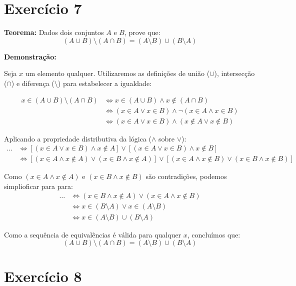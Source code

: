 \documentclass[11pt,reqno,a4paper]{amsart}
\begin{document}
\newpage
\section*{Exercício 7}

\textbf{Teorema:} Dados dois conjuntos $A$ e $B$, prove que:
\[ (A \cup B) \setminus (A \cap B) = (A \setminus B) \cup (B \setminus A) \]

\textbf{Demonstração:}

Seja $x$ um elemento qualquer. Utilizaremos as definições de união ($\cup$), intersecção ($\cap$) e diferença ($\setminus$) para estabelecer a igualdade:

\begin{align*}
x \in (A \cup B) \setminus (A \cap B) &\iff x \in (A \cup B) \land x \notin (A \cap B) \tag{Def. de diferença} \\
&\iff (x \in A \lor x \in B) \land \neg(x \in A \land x \in B) \tag{Def. de $\cup$ e $\cap$} \\
&\iff (x \in A \lor x \in B) \land (x \notin A \lor x \notin B) \tag{Lei de De Morgan}
\end{align*}

Aplicando a propriedade distributiva da lógica ($\land$ sobre $\lor$):
\begin{align*}
\dots &\iff [(x \in A \lor x \in B) \land x \notin A] \lor [(x \in A \lor x \in B) \land x \notin B] \\
&\iff [(x \in A \land x \notin A) \lor (x \in B \land x \notin A)] \lor [(x \in A \land x \notin B) \lor (x \in B \land x \notin B)]
\end{align*}

Como $(x \in A \land x \notin A)$ e $(x \in B \land x \notin B)$ são contradições, podemos simplioficar para para:
\begin{align*}
\dots &\iff (x \in B \land x \notin A) \lor (x \in A \land x \notin B) \\
&\iff x \in (B \setminus A) \lor x \in (A \setminus B) \tag{Def. de diferença} \\
&\iff x \in (A \setminus B) \cup (B \setminus A) \tag{Def. de união}
\end{align*}

Como a sequência de equivalências é válida para qualquer $x$, concluímos que:
\[ (A \cup B) \setminus (A \cap B) = (A \setminus B) \cup (B \setminus A) \]

\newpage
\section*{Exercício 8}
\end{document}
